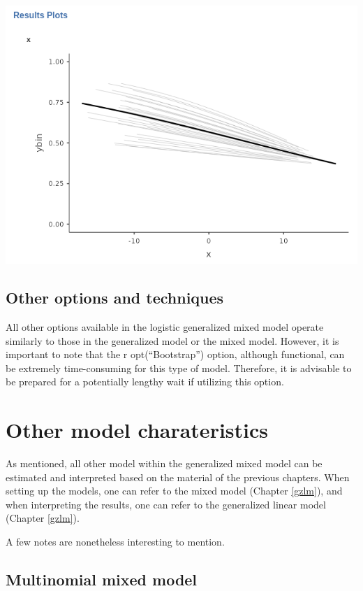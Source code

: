 \documentclass[
]{book}
\begin{document}
\includegraphics[width=0.8\linewidth]{bookletpics/5_logistic_plot1}

\hypertarget{other-options-and-techniques}{%
\subsection{Other options and techniques}\label{other-options-and-techniques}}

All other options available in the logistic generalized mixed model operate similarly to those in the generalized model or the mixed model. However, it is important to note that the r opt(``Bootstrap'') option, although functional, can be extremely time-consuming for this type of model. Therefore, it is advisable to be prepared for a potentially lengthy wait if utilizing this option.

\hypertarget{other-model-charateristics}{%
\section{Other model charateristics}\label{other-model-charateristics}}

As mentioned, all other model within the generalized mixed model can be estimated and interpreted based on the material of the previous chapters. When setting up the models, one can refer to the mixed model (Chapter \ref{gzlm}), and when interpreting the results, one can refer to the generalized linear model (Chapter \ref{gzlm}).

A few notes are nonetheless interesting to mention.

\hypertarget{multinomial-mixed-model}{%
\subsection{Multinomial mixed model}\label{multinomial-mixed-model}}
\end{document}
